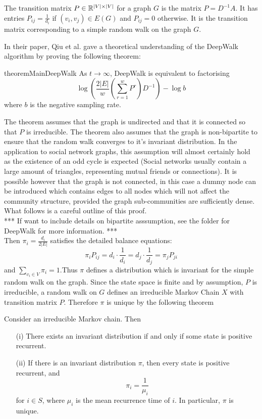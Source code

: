 \documentclass[a4paper]{article}
\begin{document}
\begin{definition}
  The transition matrix $P \in \R^{|V| \times |V|}$ for a graph $G$ is the
  matrix $P = D^{-1}A$. It has entries $P_{ij} = \frac{1}{d_i}$ if $(v_i, v_j)
  \in E(G)$ and $P_{ij} = 0$ otherwise. It is the transition matrix
  corresponding to a simple random walk on the graph $G$. 
\end{definition}

In their paper, Qiu et al. gave a theoretical understanding of the DeepWalk
algorithm by proving the following theorem:

\begin{restatable}{theorem}{MainDeepWalk}
  As $t \to \infty$, DeepWalk is equivalent to factorising
  \[\log{\left(\frac{2|E|}{w}\left( \sum_{r = 1}^w P^r  \right) D^{-1}
      \right)} - \log{b}\]
  where $b$ is the negative sampling rate.
\end{restatable}

The theorem assumes that the graph is undirected and that it is connected so
that $P$ is irreducible. The theorem also assumes that the graph is
non-bipartite to ensure that the random walk converges to it's invariant distribution. In the application to
social network graphs, this
assumption will almost certainly hold as the existence of an odd cycle is
expected (Social networks usually contain a large amount of triangles,
representing mutual friends or connections). It is possible however that the
graph is not connected, in this case a dummy node can be introduced which
contains edges to all nodes which will not affect the community structure,
provided the graph sub-communities are sufficiently dense.
What follows is a careful outline of this proof.\\

*** If want to include details on bipartite asssumption, see the folder for
DeepWalk for more information. ***\\

Then $\pi_i = \frac{d_i}{2|E|}$ satisfies the detailed balance equations:
\[\pi_i P_{ij} = d_i\cdot \frac{1}{d_i} = d_j \cdot \frac{1}{d_j} = \pi_j P_{ji}\]
and $\sum_{v_i \in V} \pi_i = 1$.Thus $\pi$ defines a distribution which is
invariant for the simple random walk on the graph. Since the state space is
finite and by assumption, $P$ is irreducible, a random walk on $G$ defines an
irreducible Markov Chain $X$ with transition matrix $P$. Therefore $\pi$ is
unique by the following theorem
\begin{theorem}
  Consider an irreducible Markov chain. Then
  \begin{itemize}
  \item[(i)] There exists an invariant distribution if and only if some state is
    positive recurrent.
  \item[(ii)] If there is an invariant distribution $\pi$, then every state is
    positive recurrent, and
    \[\pi_i = \frac{1}{\mu_i}\]
    for $i \in S$, where $\mu_i$ is the mean recurrence time of $i$. In
    particular, $\pi$ is unique.
  \end{itemize}
\end{theorem}
\end{document}
